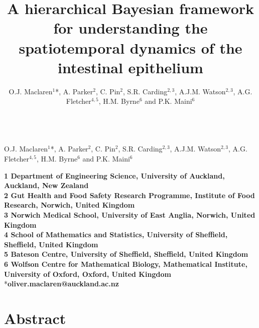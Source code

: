 \documentclass[10pt,letterpaper]{article}
\date{}
\title{A hierarchical Bayesian framework for understanding the spatiotemporal
dynamics of the intestinal epithelium}
\author{O.J. Maclaren\(^1\)*, A. Parker\(^2\), C. Pin\(^2\), S.R.
Carding\(^{2,3}\), A.J.M. Watson\(^{2,3}\), A.G. Fletcher\(^{4,5}\),
H.M. Byrne\(^6\) and P.K. Maini\(^6\)}
\date{}
\begin{document}
\vspace*{0.35in}
\begin{flushleft}
{\Large
\textbf{}
}
\newline
\\
O.J. Maclaren\(^1\)*, A. Parker\(^2\), C. Pin\(^2\), S.R.
Carding\(^{2,3}\), A.J.M. Watson\(^{2,3}\), A.G. Fletcher\(^{4,5}\),
H.M. Byrne\(^6\) and P.K. Maini\(^6\)
\end{flushleft}


\textbf{1 Department of Engineering Science, University of Auckland,
Auckland, New Zealand}\\
\textbf{2 Gut Health and Food Safety Research Programme, Institute of
Food Research, Norwich, United Kingdom}\\
\textbf{3 Norwich Medical School, University of East Anglia, Norwich,
United Kingdom}\\
\textbf{4 School of Mathematics and Statistics, University of Sheffield,
Sheffield, United Kingdom}\\
\textbf{5 Bateson Centre, University of Sheffield, Sheffield, United
Kingdom}\\
\textbf{6 Wolfson Centre for Mathematical Biology, Mathematical
Institute, University of Oxford, Oxford, United Kingdom}\\
*\textbf{oliver.maclaren@auckland.ac.nz}

\section{Abstract}\label{abstract}
\end{document}
